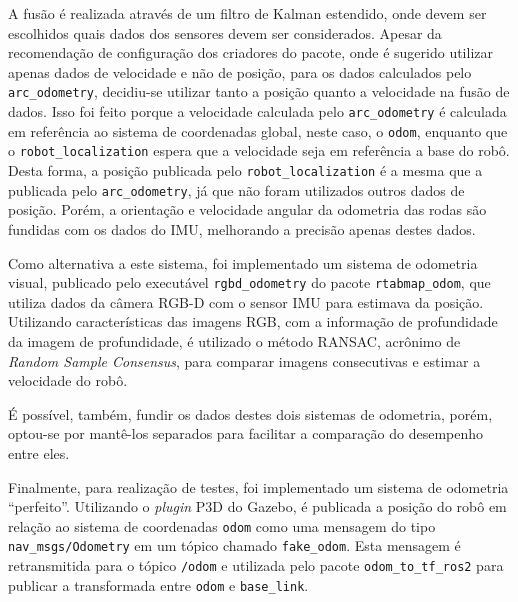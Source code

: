 \documentclass[repeatfields,xlists,xpacks,oneside,yearsonly]{ufrgscca}
\begin{document}
A fusão é realizada através de um filtro de Kalman estendido, onde devem
ser escolhidos quais dados dos sensores devem ser considerados. 
Apesar da recomendação de configuração dos criadores do pacote, onde é 
sugerido utilizar apenas dados de velocidade e não de posição, 
para os dados calculados pelo \texttt{arc\_odometry}, decidiu-se utilizar
tanto a posição quanto a velocidade na fusão de dados.
Isso foi feito porque a velocidade calculada pelo \texttt{arc\_odometry}
é calculada em referência ao sistema de coordenadas global, neste caso, o \texttt{odom},
enquanto que o \texttt{robot\_localization} espera que a velocidade seja em referência
a base do robô.
Desta forma, a posição publicada pelo \texttt{robot\_localization} é a mesma que a 
publicada pelo \texttt{arc\_odometry}, já que não foram utilizados outros dados de posição.
Porém, a orientação e velocidade angular da odometria das rodas são fundidas com os dados 
do IMU, melhorando a precisão apenas destes dados.


Como alternativa a este sistema, foi implementado um sistema de odometria visual,
publicado pelo executável \texttt{rgbd\_odometry} do pacote 
\texttt{rtabmap\_odom}, que utiliza dados da câmera RGB-D com
o sensor IMU para estimava da posição.
Utilizando 
características das imagens RGB, com a informação de profundidade
da imagem de profundidade, é utilizado o método RANSAC, acrônimo de 
\textit{Random Sample Consensus}, para comparar imagens consecutivas e estimar
a velocidade do robô.

É possível, também, fundir os dados destes dois sistemas de odometria, 
porém, optou-se por mantê-los separados para facilitar a comparação
do desempenho entre eles.

Finalmente, para realização de testes, foi implementado um sistema de odometria 
“perfeito”. 
Utilizando o \textit{plugin} P3D do Gazebo, é publicada a posição
do robô em relação ao sistema de coordenadas \texttt{odom} como uma mensagem
do tipo \texttt{nav\_msgs/Odometry} em um tópico chamado \texttt{fake\_odom}.
Esta mensagem é retransmitida para o tópico \texttt{/odom} e utilizada pelo
pacote \texttt{odom\_to\_tf\_ros2} para publicar a transformada entre
\texttt{odom} e \texttt{base\_link}.
\end{document}
